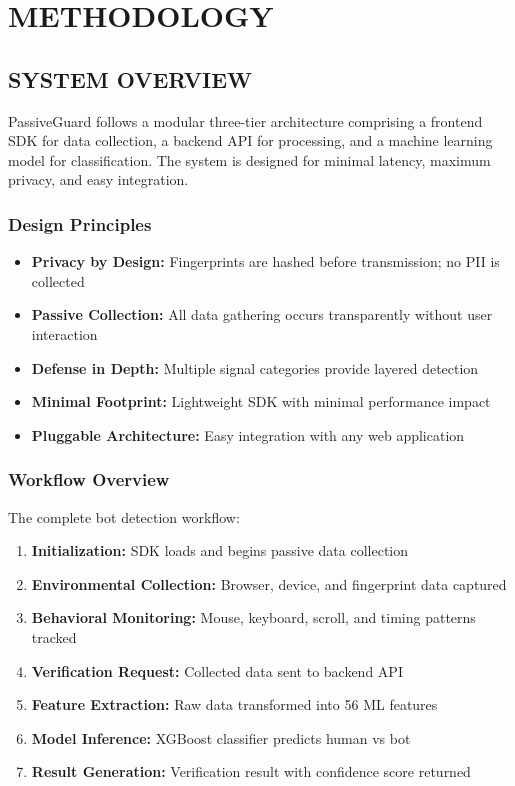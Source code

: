 
\chapter{METHODOLOGY}

\section{SYSTEM OVERVIEW}

PassiveGuard follows a modular three-tier architecture comprising a frontend SDK for data collection, a backend API for processing, and a machine learning model for classification. The system is designed for minimal latency, maximum privacy, and easy integration.

\subsection{Design Principles}

\begin{itemize}
    \item \textbf{Privacy by Design:} Fingerprints are hashed before transmission; no PII is collected
    \item \textbf{Passive Collection:} All data gathering occurs transparently without user interaction
    \item \textbf{Defense in Depth:} Multiple signal categories provide layered detection
    \item \textbf{Minimal Footprint:} Lightweight SDK with minimal performance impact
    \item \textbf{Pluggable Architecture:} Easy integration with any web application
\end{itemize}

\subsection{Workflow Overview}

The complete bot detection workflow:
\begin{enumerate}
    \item \textbf{Initialization:} SDK loads and begins passive data collection
    \item \textbf{Environmental Collection:} Browser, device, and fingerprint data captured
    \item \textbf{Behavioral Monitoring:} Mouse, keyboard, scroll, and timing patterns tracked
    \item \textbf{Verification Request:} Collected data sent to backend API
    \item \textbf{Feature Extraction:} Raw data transformed into 56 ML features
    \item \textbf{Model Inference:} XGBoost classifier predicts human vs bot
    \item \textbf{Result Generation:} Verification result with confidence score returned
\end{enumerate}


